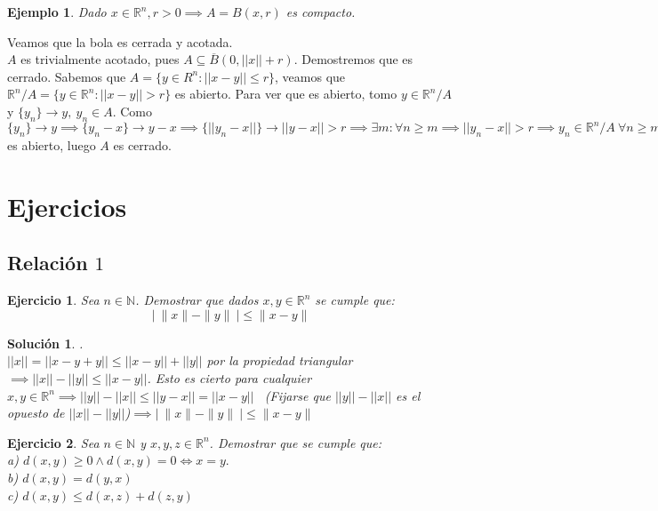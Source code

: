 \documentclass[11pt, a4paper]{article}
\makeatletter
\newif\IfInSansMode
\let\oldsf\sffamily
\renewcommand*{\sffamily}{\oldsf\mathversion{sans}\InSansModetrue}
\let\oldnorm\normalfont
\renewcommand*{\normalfont}{\oldnorm\InSansModefalse\mathversion{normal}}
\newcommand{\R}{\mathbb{R}} \newcommand{\N}{\mathbb{N}}
\renewenvironment{proof}[1][\proofname] {\par\pushQED{\qed}\normalfont\topsep6\p@\@plus6\p@\relax\trivlist\item[\hskip\labelsep\itshape\sffamily#1\@addpunct{.}]\ignorespaces}{\popQED\endtrivlist\@endpefalse}
\theoremstyle{theorem-style}
\theoremstyle{definition-style}
\newtheorem{ejer}{Ejercicio}[section]
\theoremstyle{remark-style}
\newtheorem*{sol}{Solución}
\theoremstyle{example-style}
\newtheorem{ejemplo}{Ejemplo}[section]
\makeatother
\begin{document}
\begin{ejemplo}
Dado $x \in \R^n, r > 0 \implies A = B(x,r)$ es compacto.
\end{ejemplo}

\begin{proof}
	Veamos que la bola es cerrada y acotada. \\
	$A$ es trivialmente acotado, pues $A \subseteq \overline{B}(0, ||x||+r).$ Demostremos que es cerrado. Sabemos que $A = \{y \in R^n: ||x-y|| \le r\}$, veamos que $ \R^n/A = \{y \in \R^n: ||x-y||>r\}$ es abierto. Para ver que es abierto, tomo $y \in \R^n/A$ y $ \{y_n\} \rightarrow y, \ y_n \in A$. Como $\{y_n\} \rightarrow y \implies \{y_n-x\} \rightarrow y - x \implies \{||y_n-x||\} \rightarrow ||y - x|| > r \implies \exists m: \forall n \ge m \implies ||y_n-x||>r \implies y_n \in \R^n/A \ \forall n \ge m \implies \R^n/A$ es abierto, luego $A$ es cerrado.
\end{proof}






\section{Ejercicios}

\subsection{Relación $1$}

\begin{ejer}
Sea $n \in \N$. Demostrar que dados $x,y \in \R^n$ se cumple que:
$$ | \ \|x\| - \|y\| \ |  \le \|x-y\|$$
\end{ejer}

\begin{sol}.
\\ $ ||x|| = ||x-y+y|| \le ||x-y||+||y||$ por la propiedad triangular $ \implies  ||x||-||y|| \le ||x-y||$. Esto es cierto para cualquier $x,y \in \R^n \implies ||y||-||x|| \le ||y-x|| = ||x-y|| $ \ (Fijarse que $||y||-||x||$ es el opuesto de $||x||-||y||$)$ \implies | \ \|x\| - \|y\| \ |  \le \|x-y\|$
\end{sol}

\begin{ejer}
Sea $n \in \N$ y $x,y,z \in \R^n$. Demostrar que se cumple que:
 \\ a) $d(x,y) \ge 0 \land d(x,y) = 0 \Leftrightarrow x = y.$ \\
b) $d(x,y)=d(y,x) $
 \\ c) $d(x,y) \le d(x,z)+d(z,y)$
\end{ejer}
\end{document}
